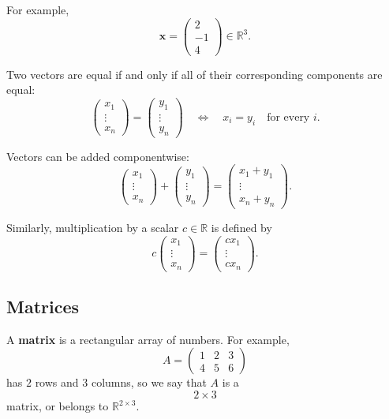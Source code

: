 \documentclass[11pt]{article}
\theoremstyle{definition}
\theoremstyle{plain}
\theoremstyle{remark}
\begin{document}
For example,
\[
\mathbf{x}
=
\begin{pmatrix}
2\\
-1\\
4
\end{pmatrix}
\in\mathbb{R}^3.
\]

Two vectors are equal if and only if all of their corresponding
components are equal:
\[
\begin{pmatrix}
x_1\\
\vdots\\
x_n
\end{pmatrix}
=
\begin{pmatrix}
y_1\\
\vdots\\
y_n
\end{pmatrix}
\quad\Longleftrightarrow\quad
x_i=y_i
\quad\text{for every }i.
\]

Vectors can be added componentwise:
\[
\begin{pmatrix}
x_1\\
\vdots\\
x_n
\end{pmatrix}
+
\begin{pmatrix}
y_1\\
\vdots\\
y_n
\end{pmatrix}
=
\begin{pmatrix}
x_1+y_1\\
\vdots\\
x_n+y_n
\end{pmatrix}.
\]

Similarly, multiplication by a scalar $c\in\mathbb{R}$ is defined by
\[
c
\begin{pmatrix}
x_1\\
\vdots\\
x_n
\end{pmatrix}
=
\begin{pmatrix}
cx_1\\
\vdots\\
cx_n
\end{pmatrix}.
\]


\subsection*{Matrices}

A \textbf{matrix} is a rectangular array of numbers. For example,
\[
A=
\begin{pmatrix}
1 & 2 & 3\\
4 & 5 & 6
\end{pmatrix}
\]
has $2$ rows and $3$ columns, so we say that $A$ is a
\[
2\times 3
\]
matrix, or belongs to $\mathbb{R}^{2\times 3}$.
\end{document}
